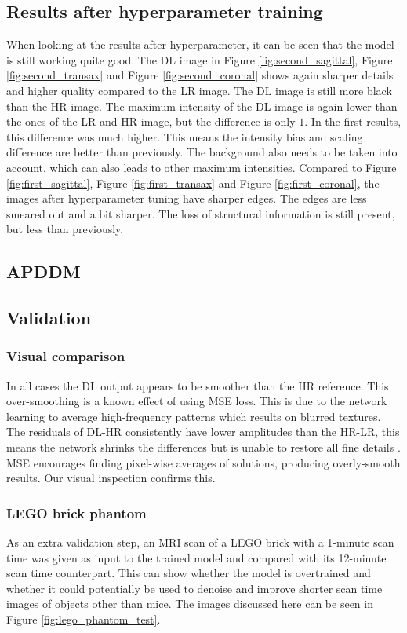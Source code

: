 \documentclass[twocolumn]{article}
\begin{document}
\subsection{Results after hyperparameter training}
When looking at the results after hyperparameter, it can be seen that the model is still working quite good. 
The DL image in Figure \ref{fig:second_sagittal}, Figure \ref{fig:second_transax} and Figure \ref{fig:second_coronal} shows again sharper details and higher quality compared to the LR image.
The DL image is still more black than the HR image.
The maximum intensity of the DL image is again lower than the ones of the LR and HR image, but the difference is only $1$. 
In the first results, this difference was much higher.
This means the intensity bias and scaling difference are better than previously.
The background also needs to be taken into account, which can also leads to other maximum intensities.
Compared to Figure \ref{fig:first_sagittal}, Figure \ref{fig:first_transax} and Figure \ref{fig:first_coronal}, the images after hyperparameter tuning have sharper edges.
The edges are less smeared out and a bit sharper.
The loss of structural information is still present, but less than previously. 

\subsection{APDDM}

\subsection{Validation}

\subsubsection{Visual comparison}
In all cases the DL output appears to be smoother than the HR reference. This over-smoothing is a known effect of using MSE loss. 
This is due to the network learning to average high-frequency patterns which results on blurred textures. 
The residuals of DL-HR consistently have lower amplitudes than the HR-LR, this means the network shrinks the differences but is unable to restore all fine details \cite{MSE}. 
MSE encourages finding pixel-wise averages of solutions, producing overly-smooth results. Our visual inspection confirms this.

\subsubsection{LEGO brick phantom}
As an extra validation step, an MRI scan of a LEGO brick with a 1-minute scan time was given as input to the trained model and compared with its 12-minute scan time counterpart. This can show whether the model is overtrained and whether it could potentially be used to denoise and improve shorter scan time images of objects other than mice. The images discussed here can be seen in Figure \ref{fig:lego_phantom_test}.
\end{document}
